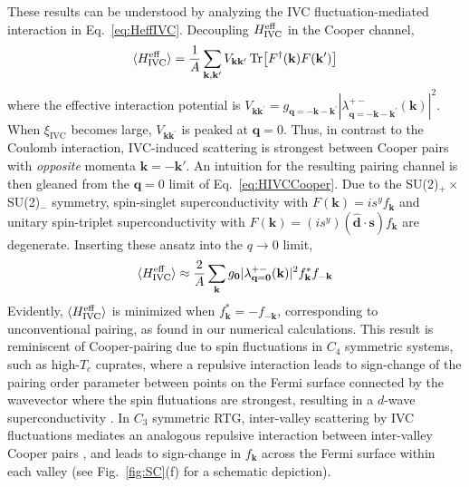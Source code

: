 \documentclass[aps,pra,twocolumn,superscriptaddress,10pt,article,nofootinbib,showpacs,longbibliography]{revtex4-1}
\def \d{{\mathbf d}}
\def \k{{\mathbf k}}
\def \q{{\mathbf q}}
\def \s{{\mathbf s}}
\def \beq{\begin{eqnarray}}
\def \eeq{\end{eqnarray}}
\begin{document}
These results can be understood by analyzing the IVC fluctuation-mediated interaction in Eq.~\eqref{eq:HeffIVC}.
Decoupling  $H^{\rm eff}_{\rm IVC}$ in the Cooper channel, 
\beq
\langle H^{\rm eff}_{\rm IVC} \rangle = \frac{1}{A} \sum_{\k, \k^\prime} V_{\k \k^\prime} \Tr[F^\dagger(\k) F(\k^\prime)] 
\label{eq:HIVCCooper}
\eeq
where the effective interaction potential is $V_{\k \k^\prime} = g_{\q = -\k - \k^\prime}   |\lambda^{+-}_{\q = -\k - \k^\prime}(\k)|^2$. 
When $\xi_\textrm{IVC}$ becomes large, $V_{\k \k^\prime}$ is peaked at $\q = 0$. Thus, in contrast to the Coulomb interaction,  IVC-induced scattering is strongest between Cooper pairs with  \emph{opposite} momenta $\k = - \k'$.
An intuition for the resulting pairing channel is then gleaned from  the $\q = 0$ limit of Eq.~\eqref{eq:HIVCCooper}.
Due to the SU(2)$_+ \times $SU(2)$_-$ symmetry,  spin-singlet superconductivity with $F(\k) = i s^y f_{\k} $ and unitary spin-triplet superconductivity with $F(\k) = (i s^y) (\hat{\d} \cdot \s) f_\k$ are degenerate.
Inserting these ansatz into the $q \to 0$ limit, 
\beq \langle H^{\rm eff}_{\rm IVC} \rangle \approx \frac{2}{A} \sum_{\k} g_{\bm 0}|\lambda^{+-}_{\q=\bm 0}(\k)|^2 f^*_\k f_{-\k}
\eeq
Evidently, $\langle H^{\rm eff}_{\rm IVC} \rangle$ is minimized when $f^*_\k = - f_{-\k}$, corresponding to unconventional pairing, as found in our numerical calculations.
This result is reminiscent of Cooper-pairing due to spin fluctuations in $C_4$ symmetric systems, such as high-$T_c$ cuprates, where a repulsive interaction leads to sign-change of the pairing order parameter between points on the Fermi surface connected by the wavevector where the spin flutuations are strongest, resulting in a $d$-wave superconductivity \cite{Scalapino95}.
In $C_3$ symmetric RTG, inter-valley scattering by IVC fluctuations mediates an analogous repulsive interaction between inter-valley Cooper pairs \cite{YV2019}, and leads to sign-change in $f_{\k}$ across the Fermi surface within each valley (see Fig.~\ref{fig:SC}(f) for a schematic depiction).
\end{document}
